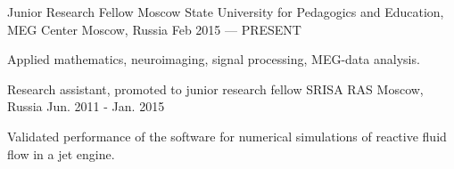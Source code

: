 \begin{cventries}
{\begin{cvitems}
      \end{cvitems} 
    }
  \cventry
    {Junior Research Fellow}
    {Moscow State University for Pedagogics and Education, MEG Center}
    {Moscow, Russia}
    {Feb 2015 — PRESENT}
    {
      \begin{cvitems}
        \item {Applied mathematics, neuroimaging, signal processing, MEG-data analysis.}
      \end{cvitems}
    }
  \cventry
    {Research assistant, promoted to junior research fellow}
    {SRISA RAS}
    {Moscow, Russia}
    {Jun. 2011 - Jan. 2015}
    {
      \begin{cvitems}
        \item{Validated performance of the software for numerical simulations of reactive fluid flow in a jet engine.}
      \end{cvitems}
    }
\end{cventries}
